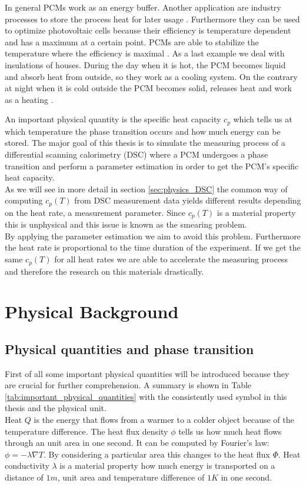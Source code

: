 \documentclass{scrartcl}[12pt, halfparskip]
\numberwithin{equation}{section}
\numberwithin{figure}{section}
\numberwithin{table}{section}
\begin{document}
In general PCMs work as an energy buffer. Another application are industry processes to store the process heat for later usage \cite{pcm_process_heat}. Furthermore they can be used to optimize photovoltaic cells because their efficiency is temperature dependent and has a maximum at a certain point. PCMs are able to stabilize the temperature where the efficiency is maximal \cite{pcm_solar_cells}. 
As a last example we deal with insulations of houses. During the day when it is hot, the PCM becomes liquid and absorb heat from outside, so they work as a cooling system. On the contrary at night when it is cold outside the PCM becomes solid, releases heat and work as a heating \cite{pcm_house_insulation}. 


An important physical quantity is the specific heat capacity $c_p$ which tells us at which temperature the phase transition occurs and how much energy can be stored. The major goal of this thesis is to simulate the measuring process of a differential scanning calorimetry (DSC) where a PCM undergoes a phase transition and perform a parameter estimation in order to get the PCM's specific heat capacity. \\
As we will see in more detail in section \ref{sec:physics_DSC} the common way of computing $c_p(T)$ from DSC measurement data yields different results depending on the heat rate, a measurement parameter. Since $c_p(T)$ is a material property this is unphysical and this issue is known as the smearing problem. \\
By applying the parameter estimation we aim to avoid this problem. Furthermore the heat rate is proportional to the time duration of the experiment. If we get the same $c_p(T)$ for all heat rates we are able to accelerate the measuring process and therefore the research on this materials drastically. 
 


\section{Physical Background}
\subsection{Physical quantities and phase transition}

First of all some important physical quantities will be introduced because they are crucial for further comprehension. A summary is shown in Table \ref{tab:important_physical_quantities} with the consistently used symbol in this thesis and the physical unit. \\
Heat $Q$ is the energy that flows from a warmer to a colder object because of the temperature difference. The heat flux density $\phi$ tells us how much heat flows through an unit area in one second. It can be computed by Fourier's law: $\phi = - \lambda \nabla T$. By considering a particular area this changes to the heat flux $\varPhi$. Heat conductivity $\lambda$ is a material property how much energy is transported on a distance of $1m$, unit area and temperature difference of $1K$ in one second.
\end{document}
